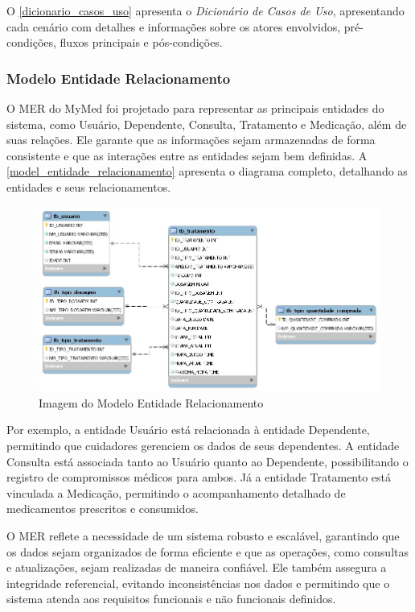 \documentclass[
	article,			%
	12pt,				%
	oneside,			%
	a4paper,			%
    BIBLATEX,           %
	english,			%
	brazil,				%
	sumario=tradicional
	]{abntex2}
\begin{document}
O \autoref{dicionario_casos_uso} apresenta o \textit{Dicionário de Casos de Uso}, apresentando cada cenário com detalhes e informações sobre os atores envolvidos, pré-condições, fluxos principais e pós-condições.


\newpage

\subsubsection{Modelo Entidade Relacionamento}

O MER do MyMed foi projetado para representar as principais entidades do sistema, como Usuário, Dependente, Consulta, Tratamento e Medicação, além de suas relações. Ele garante que as informações sejam armazenadas de forma consistente e que as interações entre as entidades sejam bem definidas. A \autoref{model_entidade_relacionamento} apresenta o diagrama completo, detalhando as entidades e seus relacionamentos.

\begin{figure}[!htbp]
    \centering
    \includegraphics[width=1.0\linewidth]{Figuras/bancoDados.jpg}
    \caption{Imagem do Modelo Entidade Relacionamento}
    \label{model_entidade_relacionamento}
\end{figure}

Por exemplo, a entidade Usuário está relacionada à entidade Dependente, permitindo que cuidadores gerenciem os dados de seus dependentes. A entidade Consulta está associada tanto ao Usuário quanto ao Dependente, possibilitando o registro de compromissos médicos para ambos. Já a entidade Tratamento está vinculada a Medicação, permitindo o acompanhamento detalhado de medicamentos prescritos e consumidos.

O MER reflete a necessidade de um sistema robusto e escalável, garantindo que os dados sejam organizados de forma eficiente e que as operações, como consultas e atualizações, sejam realizadas de maneira confiável. Ele também assegura a integridade referencial, evitando inconsistências nos dados e permitindo que o sistema atenda aos requisitos funcionais e não funcionais definidos. 
\end{document}
